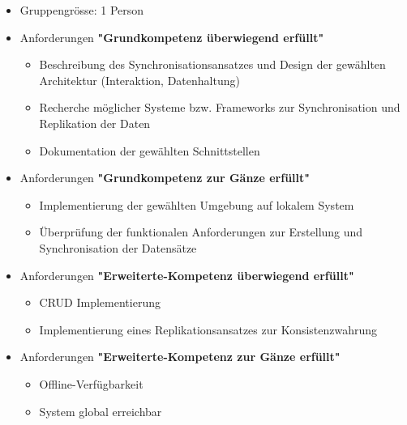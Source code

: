 \begin{itemize}
	\item Gruppengrösse: 1 Person
	\item Anforderungen \textbf{"Grundkompetenz überwiegend erfüllt"}
	\begin{itemize}
		\item Beschreibung des Synchronisationsansatzes und Design der gewählten Architektur (Interaktion, Datenhaltung)
		\item   Recherche möglicher Systeme bzw. Frameworks zur Synchronisation und Replikation der Daten
		\item Dokumentation der gewählten Schnittstellen
	\end{itemize}
	\item Anforderungen \textbf{"Grundkompetenz zur Gänze erfüllt"}
	\begin{itemize}
		\item Implementierung der gewählten Umgebung auf lokalem System
		\item Überprüfung der funktionalen Anforderungen zur Erstellung und Synchronisation der Datensätze
	\end{itemize}
	\item Anforderungen \textbf{"Erweiterte-Kompetenz überwiegend erfüllt"}
	\begin{itemize}
		\item CRUD Implementierung
		\item Implementierung eines Replikationsansatzes zur Konsistenzwahrung
	\end{itemize}
	\item Anforderungen \textbf{"Erweiterte-Kompetenz zur Gänze erfüllt"}
	\begin{itemize}
		\item Offline-Verfügbarkeit
		\item System global erreichbar
	\end{itemize}  
\end{itemize}
\clearpage